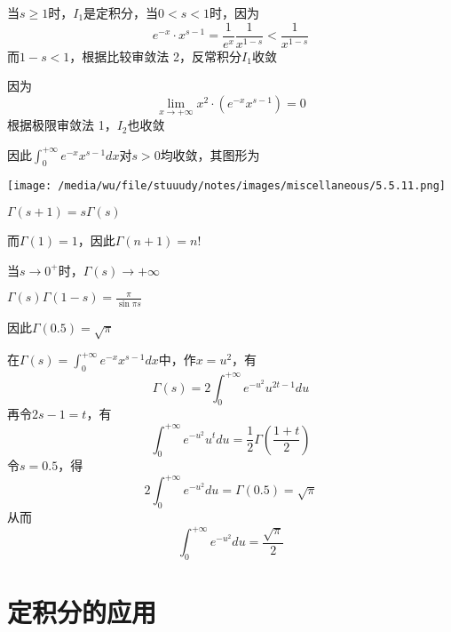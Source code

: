 \documentclass[11pt]{article}
\begin{document}
当\(s\ge1\)时，\(I_1\)是定积分，当\(0<s<1\)时，因为
\begin{equation*}
e^{-x}\cdot x^{s-1}=\frac{1}{e^x}\frac{1}{x^{1-s}}<\frac{1}{x^{1-s}}
\end{equation*}
而\(1-s<1\)，根据比较审敛法 2，反常积分\(I_1\)收敛

因为
\begin{equation*}
\lim_{x\to+\infty}x^2\cdot(e^{-x}x^{s-1})=0
\end{equation*}
根据极限审敛法 1，\(I_2\)也收敛

因此\(\int_0^{+\infty}e^{-x}x^{s-1}dx\)对\(s>0\)均收敛，其图形为
\begin{center}
\texttt{[image: /media/wu/file/stuuudy/notes/images/miscellaneous/5.5.11.png]}
\end{center}

\begin{proposition}[递推公式]
\(\Gamma(s+1)=s\Gamma(s)\)
\end{proposition}

而\(\Gamma(1)=1\)，因此\(\Gamma(n+1)=n!\)

\begin{proposition}[]
当\(s\to0^+\)时，\(\Gamma(s)\to+\infty\)
\end{proposition}

\begin{proposition}[余元公式]
\(\Gamma(s)\Gamma(1-s)=\frac{\pi}{\sin\pi s}\)
\end{proposition}

因此\(\Gamma(0.5)=\sqrt{\pi}\)

在\(\Gamma(s)=\int_0^{+\infty}e^{-x}x^{s-1}dx\)中，作\(x=u^2\)，有
\begin{equation*}
\Gamma(s)=2\int_0^{+\infty}e^{-u^2}u^{2t-1}du
\end{equation*}
再令\(2s-1=t\)，有
\begin{equation*}
 \int_0^{+\infty}e^{-u^2}u^tdu=\frac{1}{2}\Gamma(\frac{1+t}{2})
\end{equation*}
令\(s=0.5\)，得
\begin{equation*}
2\int_0^{+\infty}e^{-u^2}du=\Gamma(0.5)=\sqrt{\pi}
\end{equation*}
从而
\begin{equation*}
\int_0^{+\infty}e^{-u^2}du=\frac{\sqrt{\pi}}{2}
\end{equation*}





\section{定积分的应用}
\label{sec:org464562b}
\end{document}
